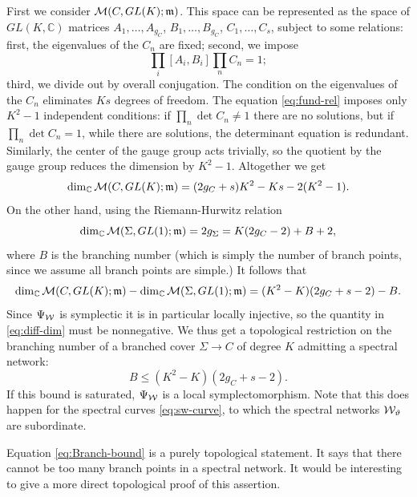 \documentclass[11pt,a4paper]{article}
\def\IC{\mathbb{C}}
\def\CM {{\cal M}}
\def\wnet {{\cal W}}
\def\IC{\mathbb{C}}
\def\CM {{\cal M}}
\def\wnet {{\cal W}}
\begin{document}
First we consider
$\CM(C, GL(K);\mathfrak{m})$.  This space can be represented
as the space of $GL(K,\IC)$ matrices $A_1, \dots, A_{g_C}$, $B_1, \dots, B_{g_C}$,
$C_1, \dots, C_s$, subject to some relations:  first, the eigenvalues of the $C_n$
are fixed; second, we impose
\begin{equation} \label{eq:fund-rel}
 \prod_i [A_i,B_i] \prod_n C_n = 1;
\end{equation}
third, we divide out by overall conjugation.
The condition on the eigenvalues of the $C_n$ eliminates $K s$ degrees of freedom.
The equation \eqref{eq:fund-rel} imposes only
$K^2-1$ independent conditions:  if $\prod_n \det C_n\not=1$
there are no solutions, but if $\prod_n \det C_n = 1$, while there are solutions,
the determinant equation is redundant.  Similarly, the center of the
gauge group acts trivially, so the quotient by the gauge group reduces the dimension
by $K^2-1$.  Altogether we get
\begin{equation}
\dim_\IC \CM(C, GL(K);\mathfrak{m}) = (2g_C + s) K^2 - K s - 2(K^2-1).
\end{equation}
On the other hand, using the Riemann-Hurwitz relation
\begin{equation}
\dim_\IC \CM(\Sigma, GL(1);\mathfrak{m}) = 2g_\Sigma = K(2g_C-2) + B + 2,
\end{equation}
where $B$ is the branching number (which is simply the number of branch points,
since we assume all branch points are simple.)
It follows that
\begin{equation} \label{eq:diff-dim}
\dim_\IC \CM(C, GL(K);\mathfrak{m}) - \dim_\IC \CM(\Sigma, GL(1);\mathfrak{m}) = (K^2-K)(2g_C + s - 2) - B.
\end{equation}
Since $\Psi_{\wnet}$ is symplectic it is in particular locally injective,
so the quantity in \eqref{eq:diff-dim} must be nonnegative.
We thus get a topological restriction
on the branching number of a branched cover $\Sigma \to C$ of degree $K$
admitting a spectral network:
\begin{equation}\label{eq:Branch-bound}
B \leq (K^2-K)(2g_C + s - 2).
\end{equation}
If this bound is saturated, $\Psi_{\wnet}$ is a local
symplectomorphism.  Note that this does happen for the
spectral curves \eqref{eq:sw-curve}, to which the spectral networks
$\wnet_\vartheta$ are subordinate.

Equation \eqref{eq:Branch-bound} is a
purely topological statement.  It says that there cannot
be too many branch points in a
spectral network.  It would be interesting to give a
more direct topological proof of this assertion.
\end{document}

